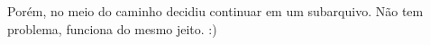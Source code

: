 \documentclass[../main.tex]{subfiles}
\begin{document}
  Porém, no meio do caminho decidiu continuar em um subarquivo. Não tem problema, funciona do mesmo jeito. :)
\end{document}
